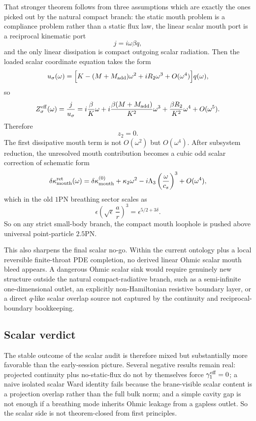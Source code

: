 \documentclass[11pt]{article}
\begin{document}
That stronger theorem follows from three assumptions which are exactly the ones
picked out by the natural compact branch: the static mouth problem is a
compliance problem rather than a static flux law, the linear scalar mouth port is
a reciprocal kinematic port
\[
j=i\omega\beta q,
\]
and the only linear dissipation is compact outgoing scalar radiation.  Then the
loaded scalar coordinate equation takes the form
\[
u_\sigma(\omega)
=
\Bigl[K-(M+M_{\rm add})\omega^2+iR_2\omega^3+O(\omega^4)\Bigr]q(\omega),
\]
so
\[
Z_\sigma^{\rm eff}(\omega)
=
\frac{j}{u_\sigma}
=
i\frac{\beta}{K}\omega
+
i\frac{\beta(M+M_{\rm add})}{K^2}\omega^3
+\frac{\beta R_2}{K^2}\omega^4
+O(\omega^5).
\]
Therefore
\[
\boxed{z_2=0.}
\]
The first dissipative mouth term is not \(O(\omega^2)\) but \(O(\omega^4)\).
After subsystem reduction, the unresolved mouth contribution becomes a cubic odd
scalar correction of schematic form
\[
\delta\kappa_{\rm mouth}^{\rm ret}(\omega)
=
\delta\kappa_{\rm mouth}^{(0)}+\kappa_2\omega^2-i\Lambda_3\left(\frac{\omega}{c_s}\right)^3+O(\omega^4),
\]
which in the old $1$PN breathing sector scales as
\[
\epsilon\left(\sqrt\epsilon\,\frac{a}{r}\right)^3
=
\epsilon^{5/2+3\delta}.
\]
So on any strict small-body branch, the compact mouth loophole is pushed above
universal point-particle $2.5$PN.

This also sharpens the final scalar no-go.  Within the current ontology plus a
local reversible finite-throat PDE completion, no derived linear Ohmic scalar
mouth bleed appears.  A dangerous Ohmic scalar sink would require genuinely new
structure outside the natural compact-radiative branch, such as a semi-infinite
one-dimensional outlet, an explicitly non-Hamiltonian resistive boundary layer,
or a direct \(q\)-like scalar overlap source not captured by the continuity and
reciprocal-boundary bookkeeping.

\subsection{Scalar verdict}
\label{sec:scalar-audit-verdict}

The stable outcome of the scalar audit is therefore mixed but substantially more
favorable than the early-session picture.  Several negative results remain real:
projected continuity plus no-static-flux do not by themselves force
\(\gamma_1^{\rm eff}=0\); a naive isolated scalar Ward identity fails because the
brane-visible scalar content is a projection overlap rather than the full bulk
norm; and a simple cavity gap is not enough if a breathing mode inherits Ohmic
leakage from a gapless outlet.  So the scalar side is not theorem-closed from
first principles.
\end{document}
